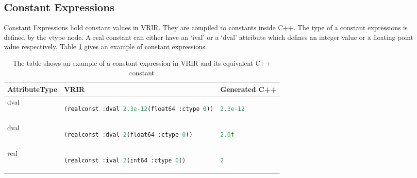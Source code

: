 \subsection{Constant Expressions}
Constant Expressions hold constant values in VRIR. They are compiled to constants inside C++. The type of a constant expressions is defined by the vtype node. A real constant can either have an `ival' or a `dval' attribute which defines an integer value or a floating point value respectively. Table \ref{tab:constExpr} gives an example of constant expressions.
\begin{table}[htbp]
\centering
\begin{tabular}{|l|l|l|}
\hline

AttributeType & VRIR &  Generated C++ \\
\hline
dval &
{
\begin{lstlisting}[language=lisp,frame=none, numbers=none]
(realconst :dval 2.3e-12(float64 :ctype 0))
\end{lstlisting}
}
&
{
\begin{lstlisting}[language=c,frame=none, numbers=none]
2.3e-12
\end{lstlisting}
} \\
\hline
dval &
{
\begin{lstlisting}[language=lisp,frame=none, numbers=none]
(realconst :dval 2(float64 :ctype 0))
\end{lstlisting}
}
&
{
\begin{lstlisting}[language=c,frame=none, numbers=none]
2.0f
\end{lstlisting}
} \\
\hline
ival &
{
\begin{lstlisting}[language=lisp,frame=none, numbers=none]
(realconst :ival 2(int64 :ctype 0))
\end{lstlisting}
}
&
{
\begin{lstlisting}[language=c,frame=none, numbers=none]
2
\end{lstlisting}
} \\
\hline
\end{tabular}
\caption[Constant Expression example]{The table shows an example of a constant expression in VRIR and its equivalent C++ constant}
\label{tab:constExpr}
\end{table}

